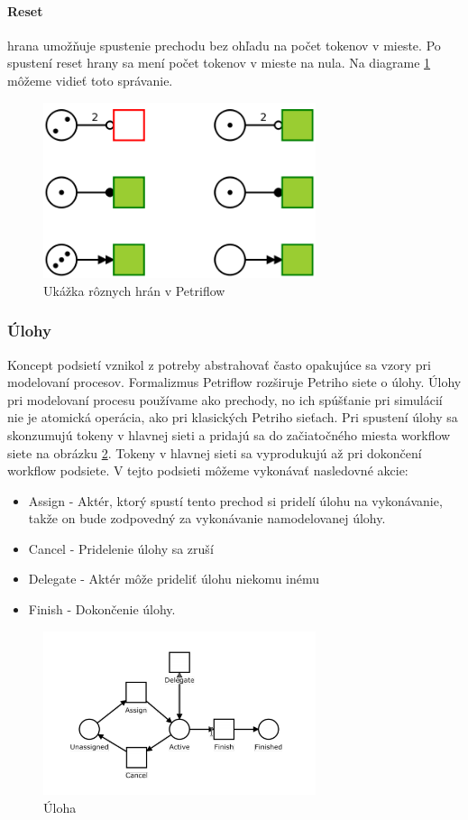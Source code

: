 \paragraph{Reset} hrana umožňuje spustenie prechodu bez ohľadu na počet tokenov v mieste. Po spustení reset hrany sa mení počet tokenov v mieste na nula. Na diagrame \ref{pn_arc_types} môžeme vidieť toto správanie.

\begin{figure}[!htbp]
\centering
\includegraphics[width=8cm]{img/pn_arc_types.png}
\caption{Ukážka rôznych hrán v Petriflow}
\label{pn_arc_types}
\end{figure}


\subsubsection{Úlohy}
Koncept podsietí vznikol z potreby abstrahovať často opakujúce sa vzory pri modelovaní procesov. Formalizmus Petriflow rozširuje Petriho siete o úlohy. Úlohy pri modelovaní procesu používame ako prechody, no ich spúšťanie pri simulácií nie je atomická operácia, ako pri klasických Petriho sieťach. Pri spustení úlohy sa skonzumujú tokeny v hlavnej sieti a pridajú sa do začiatočného miesta workflow siete na obrázku  \ref{pn_task}. Tokeny v hlavnej sieti sa vyprodukujú až pri dokončení workflow podsiete. V tejto podsieti môžeme vykonávať nasledovné akcie: 

\begin{itemize}
\item Assign - Aktér, ktorý spustí tento prechod si pridelí úlohu na vykonávanie, takže on bude zodpovedný za vykonávanie namodelovanej úlohy.
\item Cancel - Pridelenie úlohy sa zruší
\item Delegate - Aktér môže prideliť úlohu niekomu inému
\item Finish - Dokončenie úlohy. 
\end{itemize}


\begin{figure}[!htbp]
\centering
\includegraphics[width=8cm]{img/pn_task.png}
\caption{Úloha}
\label{pn_task}
\end{figure}


